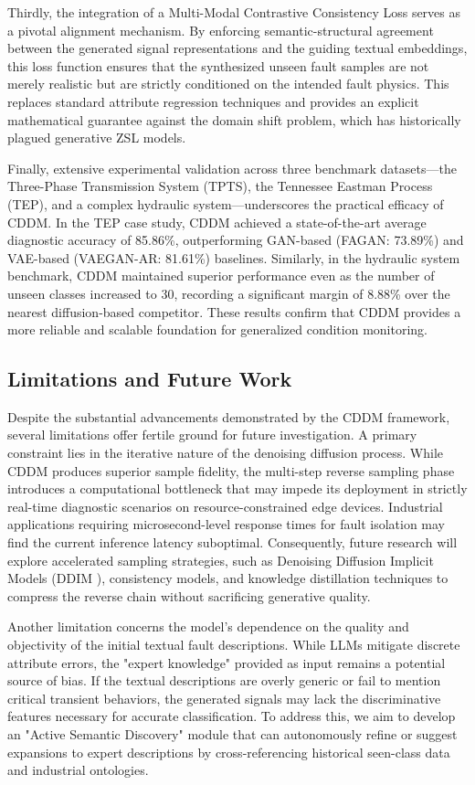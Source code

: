 Thirdly, the integration of a Multi-Modal Contrastive Consistency Loss serves as a pivotal alignment mechanism. By enforcing semantic-structural agreement between the generated signal representations and the guiding textual embeddings, this loss function ensures that the synthesized unseen fault samples are not merely realistic but are strictly conditioned on the intended fault physics. This replaces standard attribute regression techniques and provides an explicit mathematical guarantee against the domain shift problem, which has historically plagued generative ZSL models.

Finally, extensive experimental validation across three benchmark datasets—the Three-Phase Transmission System (TPTS), the Tennessee Eastman Process (TEP), and a complex hydraulic system—underscores the practical efficacy of CDDM. In the TEP case study, CDDM achieved a state-of-the-art average diagnostic accuracy of 85.86\%, outperforming GAN-based (FAGAN: 73.89\%) and VAE-based (VAEGAN-AR: 81.61\%) baselines. Similarly, in the hydraulic system benchmark, CDDM maintained superior performance even as the number of unseen classes increased to 30, recording a significant margin of 8.88\% over the nearest diffusion-based competitor. These results confirm that CDDM provides a more reliable and scalable foundation for generalized condition monitoring.

\subsection{Limitations and Future Work}
Despite the substantial advancements demonstrated by the CDDM framework, several limitations offer fertile ground for future investigation. A primary constraint lies in the iterative nature of the denoising diffusion process. While CDDM produces superior sample fidelity, the multi-step reverse sampling phase introduces a computational bottleneck that may impede its deployment in strictly real-time diagnostic scenarios on resource-constrained edge devices. Industrial applications requiring microsecond-level response times for fault isolation may find the current inference latency suboptimal. Consequently, future research will explore accelerated sampling strategies, such as Denoising Diffusion Implicit Models (DDIM \cite{song2021denoising}), consistency models, and knowledge distillation techniques to compress the reverse chain without sacrificing generative quality.

Another limitation concerns the model's dependence on the quality and objectivity of the initial textual fault descriptions. While LLMs mitigate discrete attribute errors, the "expert knowledge" provided as input remains a potential source of bias. If the textual descriptions are overly generic or fail to mention critical transient behaviors, the generated signals may lack the discriminative features necessary for accurate classification. To address this, we aim to develop an "Active Semantic Discovery" module that can autonomously refine or suggest expansions to expert descriptions by cross-referencing historical seen-class data and industrial ontologies.

